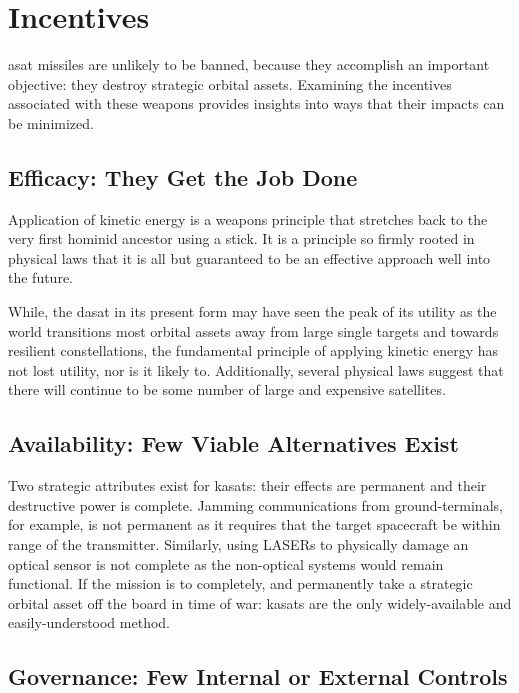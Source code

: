 \section*{Incentives}

\ac{asat} missiles are unlikely to be banned, because they accomplish
an important objective: they destroy strategic orbital assets.
Examining the incentives associated with these weapons provides
insights into ways that their impacts can be minimized.

\subsection*{Efficacy: They Get the Job Done}

Application of kinetic energy is a weapons principle that stretches
back to the very first hominid ancestor using a stick.  It is a
principle so firmly rooted in physical laws that it is all but
guaranteed to be an effective approach well into the future.

While, the \ac{dasat} in its present form may have seen the peak of
its utility as the world transitions most orbital assets away from
large single targets and towards resilient constellations, the
fundamental principle of applying kinetic energy has not lost utility,
nor is it likely to.  Additionally, several physical laws suggest that
there will continue to be some number of large and expensive
satellites.


\subsection*{Availability: Few Viable Alternatives Exist}

Two strategic attributes exist for \acp{kasat}: their effects are
permanent and their destructive power is complete.  Jamming
communications from ground-terminals, for example, is not permanent as
it requires that the target spacecraft be within range of the
transmitter.  Similarly, using LASERs to physically damage an optical
sensor is not complete as the non-optical systems would remain
functional.  If the mission is to completely, and permanently take a
strategic orbital asset off the board in time of war: \acp{kasat} are
the only widely-available and easily-understood method.\cite{brian}


\subsection*{Governance: Few Internal or External Controls}

